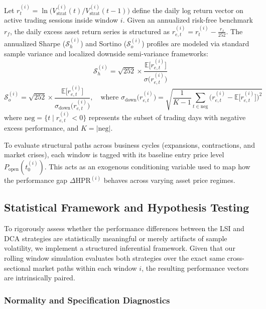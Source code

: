 \documentclass[11pt,a4paper]{article}
\begin{document}
Let $r_t^{(i)} = \ln\big(V_{\text{strat}}^{(i)}(t) / V_{\text{strat}}^{(i)}(t-1)\big)$ define the daily log return vector on active trading sessions inside window $i$. Given an annualized risk-free benchmark $r_f$, the daily excess asset return series is structured as $r_{e,t}^{(i)} = r_t^{(i)} - \frac{r_f}{252}$. The annualized Sharpe ($\mathcal{S}_h^{(i)}$) and Sortino ($\mathcal{S}_o^{(i)}$) profiles are modeled via standard sample variance and localized downside semi-variance frameworks:
\begin{equation}
\mathcal{S}_h^{(i)} = \sqrt{252} \times \frac{\mathbb{E}\big[r_{e,t}^{(i)}\big]}{\sigma\big(r_{e,t}^{(i)}\big)}
\end{equation}
\begin{equation}
\mathcal{S}_o^{(i)} = \sqrt{252} \times \frac{\mathbb{E}\big[r_{e,t}^{(i)}\big]}{\sigma_{\text{down}}\big(r_{e,t}^{(i)}\big)}, \quad \text{where } \sigma_{\text{down}}\big(r_{e,t}^{(i)}\big) = \sqrt{\frac{1}{K-1}\sum_{t \in \text{neg}} \Big(r_{e,t}^{(i)} - \mathbb{E}\big[r_{e,t}^{(i)}\big]\Big)^2}
\end{equation}
where $\text{neg} = \{t \mid r_{e,t}^{(i)} < 0\}$ represents the subset of trading days with negative excess performance, and $K = |\text{neg}|$.

To evaluate structural paths across business cycles (expansions, contractions, and market crises), each window is tagged with its baseline entry price level $P_{\text{open}}(t_0^{(i)})$. This acts as an exogenous conditioning variable used to map how the performance gap $\Delta\text{HPR}^{(i)}$ behaves across varying asset price regimes.

\subsection{Statistical Framework and Hypothesis Testing}

To rigorously assess whether the performance differences between the LSI and DCA strategies are statistically meaningful or merely artifacts of sample volatility, we implement a structured inferential framework. Given that our rolling window simulation evaluates both strategies over the exact same cross-sectional market paths within each window $i$, the resulting performance vectors are intrinsically paired.

\subsubsection{Normality and Specification Diagnostics}
\end{document}
